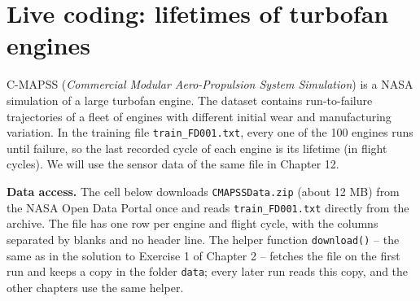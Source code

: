 \documentclass[
  letterpaper,
  DIV=11,
  numbers=noendperiod]{scrreprt}
\begin{document}
\section{Live coding: lifetimes of turbofan
engines}\label{live-coding-lifetimes-of-turbofan-engines}

C-MAPSS (\emph{Commercial Modular Aero-Propulsion System Simulation}) is
a NASA simulation of a large turbofan engine. The dataset contains
run-to-failure trajectories of a fleet of engines with different initial
wear and manufacturing variation. In the training file
\texttt{train\_FD001.txt}, every one of the 100 engines runs until
failure, so the last recorded cycle of each engine is its lifetime (in
flight cycles). We will use the sensor data of the same file in Chapter
12.

\textbf{Data access.} The cell below downloads \texttt{CMAPSSData.zip}
(about 12 MB) from the NASA Open Data Portal once and reads
\texttt{train\_FD001.txt} directly from the archive. The file has one
row per engine and flight cycle, with the columns separated by blanks
and no header line. The helper function \texttt{download()} -- the same
as in the solution to Exercise 1 of Chapter 2 -- fetches the file on the
first run and keeps a copy in the folder \texttt{data}; every later run
reads this copy, and the other chapters use the same helper.
\end{document}
